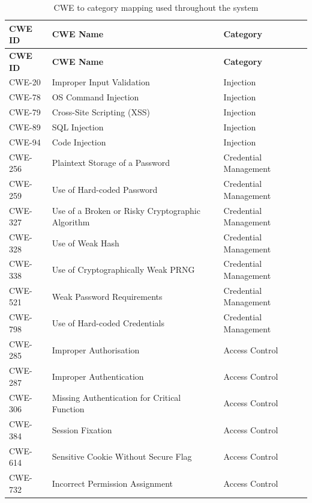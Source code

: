 \documentclass[12pt,a4paper]{report}
\begin{document}
\begin{longtable}{@{}lll@{}}
\caption{CWE to category mapping used throughout the system}
\label{tab:cwemap} \\
\toprule
\textbf{CWE ID} & \textbf{CWE Name} & \textbf{Category} \\
\midrule
\endfirsthead
\toprule
\textbf{CWE ID} & \textbf{CWE Name} & \textbf{Category} \\
\midrule
\endhead
\bottomrule
\endlastfoot
CWE-20  & Improper Input Validation                        & Injection \\
CWE-78  & OS Command Injection                             & Injection \\
CWE-79  & Cross-Site Scripting (XSS)                       & Injection \\
CWE-89  & SQL Injection                                    & Injection \\
CWE-94  & Code Injection                                   & Injection \\
CWE-256 & Plaintext Storage of a Password                  & Credential Management \\
CWE-259 & Use of Hard-coded Password                       & Credential Management \\
CWE-327 & Use of a Broken or Risky Cryptographic Algorithm & Credential Management \\
CWE-328 & Use of Weak Hash                                 & Credential Management \\
CWE-338 & Use of Cryptographically Weak PRNG               & Credential Management \\
CWE-521 & Weak Password Requirements                       & Credential Management \\
CWE-798 & Use of Hard-coded Credentials                    & Credential Management \\
CWE-285 & Improper Authorisation                           & Access Control \\
CWE-287 & Improper Authentication                          & Access Control \\
CWE-306 & Missing Authentication for Critical Function     & Access Control \\
CWE-384 & Session Fixation                                 & Access Control \\
CWE-614 & Sensitive Cookie Without Secure Flag             & Access Control \\
CWE-732 & Incorrect Permission Assignment                  & Access Control \\

\end{longtable}
\end{document}
